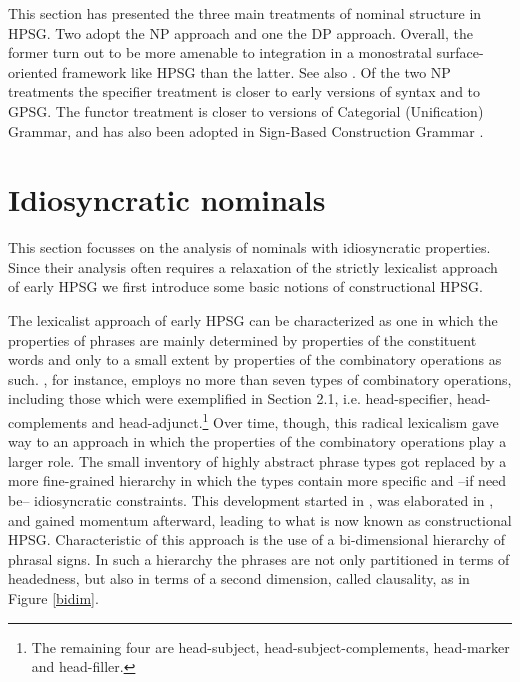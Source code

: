 \documentclass[output=paper]{langsci/langscibook}
\begin{document}
This section has presented the three main treatments of nominal structure in HPSG. 
Two adopt the NP approach and one the DP approach.
Overall, the former turn out to be more amenable to integration  
in a monostratal surface-oriented framework like HPSG than the latter. 
See also \citet{MuellerHeadless}. Of the two NP treatments
the specifier treatment is closer to early versions of \xbar syntax and to GPSG.   
The functor treatment is closer to versions of Categorial (Unification) Grammar, and 
has also been adopted in Sign-Based Construction Grammar \citep{Sag2012}.
 

\section{Idiosyncratic nominals}


This section focusses on the analysis of nominals with idiosyncratic properties. 
Since their analysis often requires 
a relaxation of the strictly lexicalist approach of early HPSG we first introduce some basic 
notions of constructional HPSG. 

The lexicalist approach of early HPSG can be characterized as one in which the 
properties of phrases are mainly determined by properties of the constituent words 
and only to a small extent by properties of the combinatory operations as such. 
\citet[391]{ps2}, for instance, employs no more than seven types 
of combinatory operations, including those which were exemplified in Section 2.1, 
i.e. head-specifier, head-complements and head-adjunct.\footnote{The remaining four 
are head-subject, head-subject-complements, head-marker and head-filler.}   
Over time, though, this radical lexicalism gave way to an 
approach in which the properties of the combinatory operations  
play a larger role. The small inventory of highly 
abstract phrase types got replaced by a more fine-grained hierarchy  
in which the types contain more specific and --if need be-- idiosyncratic 
constraints. This development started in \citet{Sag97}, was 
elaborated in \citet{GS00}, and gained momentum afterward,
leading to what is now known as constructional HPSG. 
Characteristic of this approach is the use of a bi-dimensional hierarchy 
of phrasal signs. In such a hierarchy the phrases are not only partitioned 
in terms of {\sc headedness}, but also in terms of a second dimension, called  
{\sc clausality}, as in Figure \ref{bidim}. 
\end{document}

